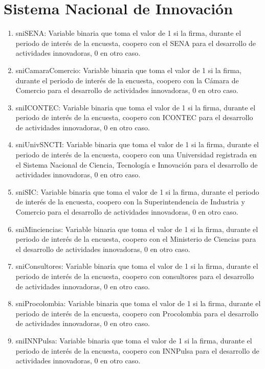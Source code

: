 \documentclass[12pt,a4paper]{article}
\begin{document}
\section{Sistema Nacional de Innovación}

\begin{enumerate}
	\item sniSENA:  Variable binaria que toma el valor de 1 si la firma, durante el periodo de interés de la encuesta, coopero con el SENA para el desarrollo de actividades innovadoras, 0 en otro caso.
	\item sniCamaraComercio:  Variable binaria que toma el valor de 1 si la firma, durante el periodo de interés de la encuesta, coopero con la Cámara de Comercio para el desarrollo de actividades innovadoras, 0 en otro caso.
	\item sniICONTEC:  Variable binaria que toma el valor de 1 si la firma, durante el periodo de interés de la encuesta, coopero con ICONTEC para el desarrollo de actividades innovadoras, 0 en otro caso.
	\item sniUnivSNCTI:  Variable binaria que toma el valor de 1 si la firma, durante el periodo de interés de la encuesta, coopero con una Universidad registrada en el Sistema Nacional de Ciencia, Tecnología e Innovación para el desarrollo de actividades innovadoras, 0 en otro caso.
	\item sniSIC:  Variable binaria que toma el valor de 1 si la firma, durante el periodo de interés de la encuesta, coopero con la Superintendencia de Industria y Comercio para el desarrollo de actividades innovadoras, 0 en otro caso.
	\item sniMinciencias:  Variable binaria que toma el valor de 1 si la firma, durante el periodo de interés de la encuesta, coopero con el Ministerio de Ciencias para el desarrollo de actividades innovadoras, 0 en otro caso.
	\item sniConsultores:  Variable binaria que toma el valor de 1 si la firma, durante el periodo de interés de la encuesta, coopero con consultores para el desarrollo de actividades innovadoras, 0 en otro caso.
	\item sniProcolombia:  Variable binaria que toma el valor de 1 si la firma, durante el periodo de interés de la encuesta, coopero con Procolombia para el desarrollo de actividades innovadoras, 0 en otro caso.
	\item sniINNPulsa:  Variable binaria que toma el valor de 1 si la firma, durante el periodo de interés de la encuesta, coopero con INNPulsa para el desarrollo de actividades innovadoras, 0 en otro caso.
\end{enumerate}
\end{document}
